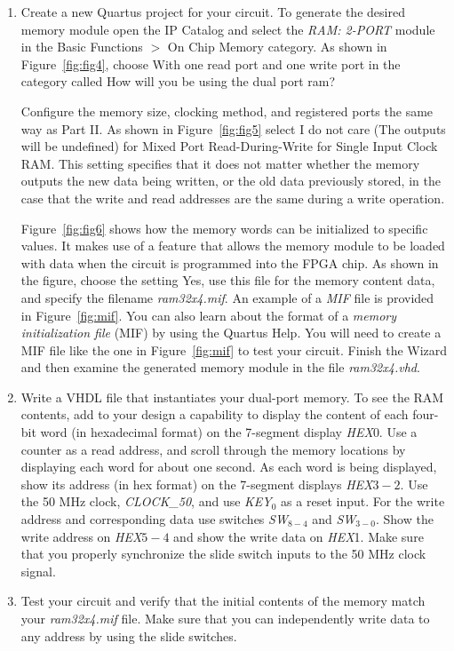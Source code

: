 \documentclass[epsfig,10pt,fullpage]{article}
\begin{document}
\begin{enumerate}
\item Create a new Quartus project for your circuit. To generate the desired memory
module open the IP Catalog and select the {\it RAM: 2-PORT} module in the 
{\sf Basic Functions $>$  On Chip Memory} category. As shown in Figure~\ref{fig:fig4}, 
choose {\sf With one read port and one write port} in the category called {\sf How will 
you be using the dual port ram?}

Configure the memory size, clocking method, and registered ports the same way as Part II.
As shown in Figure~\ref{fig:fig5} select {\sf I do not care (The outputs will be undefined)} 
for {\sf Mixed Port Read-During-Write for Single Input Clock RAM}.
This setting specifies that it does not matter whether the memory outputs the new data being 
written, or the old data previously stored, in the case that the write and read addresses are 
the same during a write operation.

Figure~\ref{fig:fig6} shows how the memory words can be initialized to specific values. It 
makes use of a feature that allows the memory module to be loaded with data when the circuit is
programmed into the FPGA chip. As shown in the figure, choose the setting {\sf Yes, use this
file for the memory content data}, and specify the filename {\it ram32x4.mif}. An example
of a {\it MIF} file is provided in Figure~\ref{fig:mif}. You can also learn
about the format of a {\it memory initialization file} (MIF) by using the Quartus Help.
You will need to create a MIF file like the one in Figure~\ref{fig:mif} to test your circuit.
Finish the Wizard and then examine the generated memory module in the file {\it ram32x4.vhd}.

\item Write a VHDL file that instantiates your dual-port memory. 
To see the RAM contents, add to your design a capability to display the
content of each four-bit word (in hexadecimal format) on the 7-segment display
{\it HEX}0. Use a counter as a read address, and scroll through the memory locations 
by displaying each word for about one second. As each word is being displayed, show its 
address (in hex format) on the 7-segment displays {\it HEX}$3-2$. Use the 50 MHz 
clock, {\it CLOCK\_50}, and use {\it KEY}$_0$ as a reset input. For 
the write address and corresponding data use switches {\it SW}$_{8-4}$ and {\it SW}$_{3-0}$.
Show the write address on {\it HEX}$5-4$ and show the write data on {\it HEX}1.
Make sure that you properly synchronize the slide switch inputs to the 50 MHz clock signal.

\item Test your circuit and verify that the initial contents of the memory match
your {\it ram32x4.mif} file. Make sure that you can independently write data to any
address by using the slide switches.
\end{enumerate}
\end{document}
